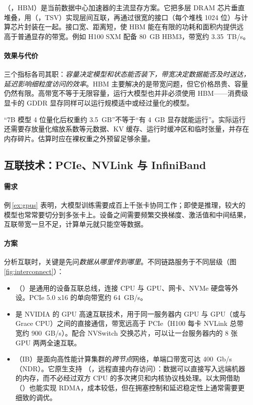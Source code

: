 

（，HBM）是当前数据中心加速器的主流显存方案。它把多层 DRAM 芯片垂直堆叠，用（，TSV）实现层间互联，再通过很宽的接口（每个堆栈 1024 位）与计算芯片封装在一起。接口宽、距离短，使 HBM 能在有限的功耗和面积内提供远高于普通显存的带宽。例如 H100 SXM 配备 \SI{80}{GB} HBM3，带宽约 \SI{3.35}{TB/s}\cite{nvidia2023h100}。

\paragraph{效果与代价} 三个指标各司其职：\emph{容量决定模型和状态能否装下，带宽决定数据能否及时送达，延迟影响细粒度访问的效率}。HBM 主要解决的是带宽问题，但它价格昂贵、容量仍然有限。高带宽不等于无限容量，运行大模型也并非必须使用 HBM——消费级显卡的 GDDR 显存同样可以运行规模适中或经过量化的模型。

\begin{pitfall}
“7B 模型 4 位量化后权重约 \SI{3.5}{GB}”不等于“有 \SI{4}{GB} 显存就能运行”。实际运行还需要存放量化缩放系数等元数据、KV 缓存、运行时缓冲区和临时张量，并存在内存碎片。估算时应在裸权重之外预留足够余量。
\end{pitfall}

\subsection{互联技术：PCIe、NVLink 与 InfiniBand}
\label{subsec:interconnect}

\paragraph{需求} 例\,\ref{ex:gpus} 表明，大模型训练需要成百上千张卡协同工作；即使是推理，较大的模型也常常要切分到多张卡上。设备之间需要频繁交换梯度、激活值和中间结果，互联带宽一旦不足，计算单元就只能空等数据。

\paragraph{方案} 分析互联时，关键是先问\emph{数据从哪里传到哪里}。不同链路服务于不同层级（图\,\ref{fig:interconnect}）：
\begin{itemize}
  \item {}（）是通用的设备互联总线，连接 CPU 与 GPU、网卡、NVMe 硬盘等外设。PCIe 5.0 x16 的单向带宽约 \SI{64}{GB/s}。
  \item {} 是 NVIDIA 的 GPU 高速互联技术，用于同一服务器内 GPU 与 GPU（或与 Grace CPU）之间的直接通信，带宽远高于 PCIe（H100 每卡 NVLink 总带宽约 \SI{900}{GB/s}\cite{nvidia2023h100}）。配合 NVSwitch 交换芯片，可以让一台服务器内的 8 张 GPU 两两全速互联。
  \item {}（IB）是面向高性能计算集群的\emph{跨节点}网络，单端口带宽可达 \SI{400}{Gb/s}（NDR）。它原生支持 （，远程直接内存访问）：数据可以直接写入远端机器的内存，而不必经过双方 CPU 的多次拷贝和内核协议栈处理。以太网借助 （）也能实现 RDMA，成本较低，但在拥塞控制和延迟稳定性上通常需要更细致的调优。
\end{itemize}

